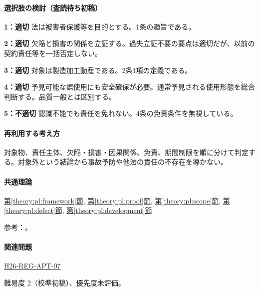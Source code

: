 \paragraph{選択肢の検討（査読待ち初稿）}\mbox{}\par

\noindent\textbf{1：適切} 法は被害者保護等を目的とする。1条の趣旨である。\par

\noindent\textbf{2：適切} 欠陥と損害の関係を立証する。過失立証不要の要点は適切だが、以前の契約責任等を一括否定しない。\par

\noindent\textbf{3：適切} 対象は製造加工動産である。2条1項の定義である。\par

\noindent\textbf{4：適切} 予見可能な誤使用にも安全確保が必要。通常予見される使用形態を総合判断する。品質一般とは区別する。\par

\noindent\textbf{5：不適切} 認識不能でも責任を免れない。4条の免責条件を無視している。\par

\paragraph{再利用する考え方} 対象物、責任主体、欠陥・損害・因果関係、免責、期間制限を順に分けて判定する。対象外という結論から事故予防や他法の責任の不存在を導かない。

\paragraph{共通理論} \hyperref[theory:pl:framework]{第\ref*{theory:pl:framework}節}, \hyperref[theory:pl:proof]{第\ref*{theory:pl:proof}節}, \hyperref[theory:pl:scope]{第\ref*{theory:pl:scope}節}, \hyperref[theory:pl:defect]{第\ref*{theory:pl:defect}節}, \hyperref[theory:pl:development]{第\ref*{theory:pl:development}節}

\par 参考：\cite{pl_statute,pl_qa,pl_definitions2018}。

\paragraph{関連問題} \hyperref[q:h26-reg-apt-07]{H26-REG-APT-07}

\par 難易度 2（校準初稿）、優先度未評価。

